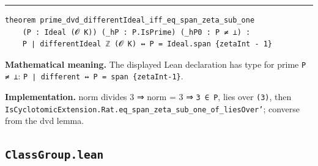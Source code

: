 \documentclass[UTF8,a4paper,11pt,fontset=fandol]{ctexart}
\theoremstyle{definition}
\newcommand{\statementsep}{\par\medskip\hrule\medskip}
\begin{document}
\statementsep
\begin{verbatim}
theorem prime_dvd_differentIdeal_iff_eq_span_zeta_sub_one
    (P : Ideal (𝓞 K)) (_hP : P.IsPrime) (_hP0 : P ≠ ⊥) :
    P ∣ differentIdeal ℤ (𝓞 K) ↔ P = Ideal.span {zetaInt - 1}
\end{verbatim}
\noindent\textbf{Mathematical meaning.} The displayed Lean declaration has type for prime \texttt{P ≠ ⊥}: \texttt{P ∣ different ↔ P = span \{zetaInt-1\}}.\par
\noindent\textbf{Implementation.} norm divides 3 ⇒ norm = 3 ⇒ \texttt{3 ∈ P}, lies over \texttt{(3)}, then \texttt{IsCyclotomicExtension.\allowbreak{}Rat.\allowbreak{}eq\_\allowbreak{}span\_\allowbreak{}zeta\_\allowbreak{}sub\_\allowbreak{}one\_\allowbreak{}of\_\allowbreak{}liesOver'}; converse from the dvd lemma.\par

\subsection{\texttt{ClassGroup.lean}}
\end{document}
